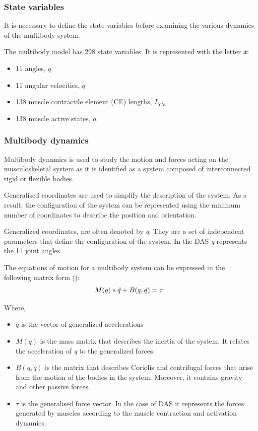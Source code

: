 \subsubsection{State variables}\label{state}

It is necessary to define the state variables before examining the various dynamics of the multibody system.

The multibody model has 298 state variables. It is represented with the letter\textbf{ \textit{x}}:
\begin{itemize}
    \item 11 angles, $q$
    \item 11 angular velocities, $\dot{q}$
    \item 138 muscle contractile element (CE) lengths, $L_{CE}$
    \item 138 muscle active states, $a$
\end{itemize}

 
\subsubsection{Multibody dynamics}

Multibody dynamics is used to study the motion and forces acting on the musculoskeletal system as it is identified as a system composed of interconnected rigid or flexible bodies. 

Generalised coordinates are used to simplify the description of the system. As a result, the configuration of the system can be represented using the minimum number of coordinates to describe the position and orientation.  

Generalized coordinates, are often denoted by \textit{q}. They are a set of independent parameters that define the configuration of the system. In the DAS \textit{q} represents the 11 joint angles. 

The equations of motion for a multibody system can be expressed in the following matrix form (\cite{Siciliano2009}):
\begin{equation}
    M(q)*\Ddot{q} + B(q,\dot{q}) = \tau
    \label{eq:MBD}
\end{equation}

Where,
\begin{itemize}
    \item $\ddot{q}$ is the vector of generalized accelerations
    \item $M(q)$ is the mass matrix that describes the inertia of the system. It relates the acceleration of \textit{q} to the generalized forces.
    \item $B(q,\dot{q})$ is the matrix that describes Coriolis and centrifugal forces that arise from the motion of the bodies in the system. Moreover, it contains gravity and other passive forces.
    \item $\tau$ is the generalised force vector. In the case of DAS it represents the forces generated by muscles according to the muscle contraction and activation dynamics. 
\end{itemize}

